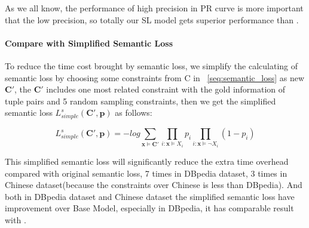 As we all know, the performance of high precision in PR curve is more important that the low precision, so totally our SL model gets superior performance than \ILP.
\paragraph{Compare with Simplified Semantic Loss}
To reduce the time cost brought by semantic loss, we simplify the calculating of semantic loss by choosing some constraints from C in ~\ref{seq:semantic_loss} as new $\bm{C'}$, the $ \bm{C'} $ includes one most related constraint with the gold information of tuple pairs and 5 random sampling constraints, then we get the simplified semantic loss $ L^{s}_{simple}(\bm{C'}, \bm{p}) $ as follows:

\begin{equation}
\label{seq:semantic_loss_simple}
L^{s}_{simple}(\bm{C'}, \bm{p}) = -log\sum\limits_{\bm x\models\bm{C'}}\prod\limits_{i:\bm x\models X_i}p_i\prod\limits_{i:\bm x\models \neg X_i}(1-p_i)
\end{equation}

This simplified semantic loss will significantly reduce the extra time overhead compared with original semantic loss, 7 times in DBpedia dataset, 3 times in Chinese dataset(because the constraints over Chinese is less than DBpedia). And both in DBpedia dataset and Chinese dataset the simplified semantic loss have improvement over Base Model, especially in DBpedia, it has comparable result with \ILP.


